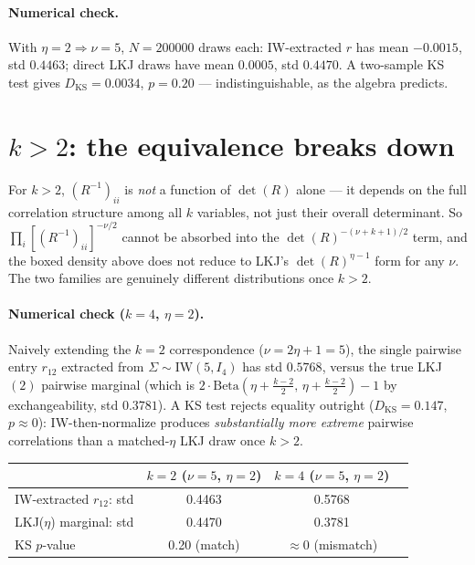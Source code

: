 \documentclass[11pt]{article}
\newcommand{\IW}{\mathrm{IW}}
\begin{document}
\paragraph{Numerical check.} With $\eta=2 \Rightarrow \nu=5$, $N=\num{200000}$
draws each: IW-extracted $r$ has mean $-0.0015$, std $0.4463$; direct LKJ draws
have mean $0.0005$, std $0.4470$. A two-sample KS test gives
$D_{\mathrm{KS}}=0.0034$, $p=0.20$ --- indistinguishable, as the algebra predicts.

\section*{$k>2$: the equivalence breaks down}

For $k>2$, $(R^{-1})_{ii}$ is \emph{not} a function of $\det(R)$ alone --- it
depends on the full correlation structure among all $k$ variables, not just
their overall determinant. So $\prod_i[(R^{-1})_{ii}]^{-\nu/2}$ cannot be
absorbed into the $\det(R)^{-(\nu+k+1)/2}$ term, and the boxed density above
does not reduce to LKJ's $\det(R)^{\eta-1}$ form for any $\nu$. The two
families are genuinely different distributions once $k>2$.

\paragraph{Numerical check ($k=4$, $\eta=2$).} Naively extending the $k=2$
correspondence ($\nu = 2\eta+1 = 5$), the single pairwise entry $r_{12}$
extracted from $\Sigma \sim \IW(5, I_4)$ has std $0.5768$, versus the true LKJ$(2)$
pairwise marginal (which is $2\cdot\mathrm{Beta}(\eta+\tfrac{k-2}{2},\,\eta+\tfrac{k-2}{2})-1$
by exchangeability, std $0.3781$). A KS test rejects equality outright
($D_{\mathrm{KS}}=0.147$, $p\approx 0$): IW-then-normalize produces
\emph{substantially more extreme} pairwise correlations than a matched-$\eta$
LKJ draw once $k>2$.

\begin{center}
\begin{tabular}{lccc}
  \toprule
  & $k=2$ ($\nu=5$, $\eta=2$) & $k=4$ ($\nu=5$, $\eta=2$) \\
  \midrule
  IW-extracted $r_{12}$: std & 0.4463 & 0.5768 \\
  LKJ($\eta$) marginal: std  & 0.4470 & 0.3781 \\
  KS $p$-value               & 0.20 (match) & $\approx 0$ (mismatch) \\
  \bottomrule
\end{tabular}
\end{center}
\end{document}
